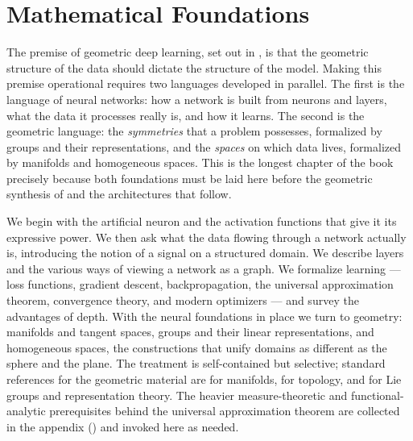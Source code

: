 \providecommand{\GL}{\operatorname{GL}}
\providecommand{\SO}{\operatorname{SO}}
\providecommand{\Orth}{\operatorname{O}}
\providecommand{\SU}{\operatorname{SU}}
\providecommand{\U}{\operatorname{U}}
\providecommand{\SL}{\operatorname{SL}}
\providecommand{\SE}{\operatorname{SE}}
\providecommand{\Sym}{\operatorname{Sym}}
\providecommand{\Stab}{\operatorname{Stab}}
\providecommand{\Orb}{\operatorname{Orb}}
\providecommand{\Aut}{\operatorname{Aut}}
\providecommand{\Img}{\operatorname{Im}}
\providecommand{\rank}{\operatorname{rank}}
\providecommand{\tr}{\operatorname{tr}}
\providecommand{\ReLU}{\operatorname{ReLU}}
\providecommand{\Lie}[1]{\mathfrak{#1}}

\chapter{Mathematical Foundations}
\label{ch:foundations}

The premise of geometric deep learning, set out in , is
that the geometric structure of the data should dictate the structure of the
model. Making this premise operational requires two languages developed in
parallel. The first is the language of neural networks: how a network is built
from neurons and layers, what the data it processes really is, and how it
learns. The second is the geometric language: the \emph{symmetries} that a
problem possesses, formalized by groups and their representations, and the
\emph{spaces} on which data lives, formalized by manifolds and homogeneous
spaces. This is the longest chapter of the book precisely because both
foundations must be laid here before the geometric synthesis of 
and the architectures that follow.

We begin with the artificial neuron and the activation functions that give it
its expressive power. We then ask what the data flowing through a network
actually is, introducing the notion of a signal on a structured domain. We
describe layers and the various ways of viewing a network as a graph. We
formalize learning --- loss functions, gradient descent, backpropagation, the
universal approximation theorem, convergence theory, and modern optimizers ---
and survey the advantages of depth. With the neural foundations in place we turn
to geometry: manifolds and tangent spaces, groups and their linear
representations, and homogeneous spaces, the constructions that unify domains as
different as the sphere and the plane. The treatment is self-contained but
selective; standard references for the geometric material are
\citet{lee2012introduction} for manifolds, \citet{munkres2000topology} for
topology, and \citet{Kirillov2008,Fulton1991} for Lie groups and representation
theory. The heavier measure-theoretic and functional-analytic prerequisites
behind the universal approximation theorem are collected in the appendix
() and invoked here as needed.

